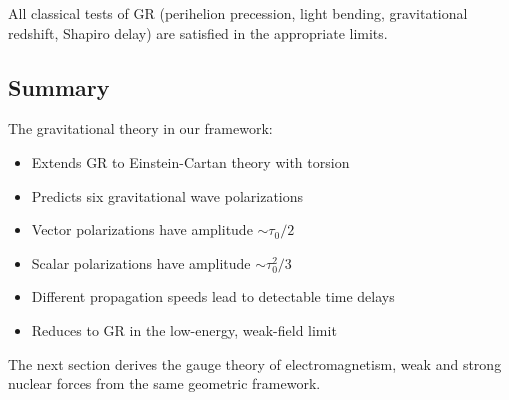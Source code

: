 All classical tests of GR (perihelion precession, light bending, gravitational redshift, Shapiro delay) are satisfied in the appropriate limits.

\subsection{Summary}

The gravitational theory in our framework:
\begin{itemize}
    \item Extends GR to Einstein-Cartan theory with torsion
    \item Predicts six gravitational wave polarizations
    \item Vector polarizations have amplitude $\sim \tau_0/2$
    \item Scalar polarizations have amplitude $\sim \tau_0^2/3$
    \item Different propagation speeds lead to detectable time delays
    \item Reduces to GR in the low-energy, weak-field limit
\end{itemize}

The next section derives the gauge theory of electromagnetism, weak and strong nuclear forces from the same geometric framework.

